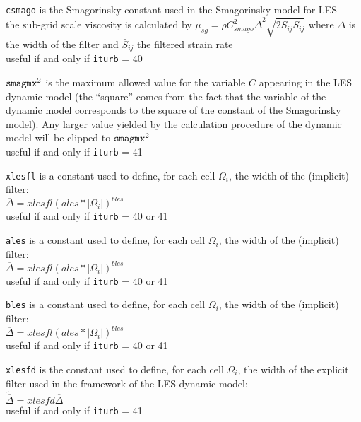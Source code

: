 {{\tt csmago} is the Smagorinsky constant used in
the Smagorinsky model for LES\\
the sub-grid scale viscosity is calculated by
 $\displaystyle\mu_{sg}=\rho C_{smago}^2\bar{\Delta}^2\sqrt{2\bar{S}_{ij}\bar{S}_{ij}}$
where $\bar{\Delta}$ is the width of the filter and $\bar{S}_{ij}$ the filtered
strain rate\\
useful if and only if {\tt iturb} = 40}

{${\tt smagmx}^2$ is
the maximum allowed value for the variable $C$ appearing in the LES dynamic
model (the ``square'' comes from the fact that the
variable of the dynamic model corresponds to the square of the
constant of the Smagorinsky model). Any larger value yielded by the calculation
procedure of the dynamic model will be clipped to ${\tt smagmx}^2$\\
useful if and only if {\tt iturb} = 41}

{{\tt xlesfl} is a constant used to define, for
each cell $\Omega_i$, the width of the (implicit) filter:\\
$\overline{\Delta}=xlesfl(ales*|\Omega_i|)^{bles}$\\
useful if and only if {\tt iturb} = 40 or 41}

{{\tt ales} is a constant used to define, for
each cell $\Omega_i$, the width of the (implicit) filter:\\
$\overline{\Delta}=xlesfl(ales*|\Omega_i|)^{bles}$\\
useful if and only if {\tt iturb} = 40 or 41}

{{\tt bles} is a constant used to define, for
each cell $\Omega_i$, the width of the (implicit) filter:\\
$\overline{\Delta}=xlesfl(ales*|\Omega_i|)^{bles}$\\
useful if and only if {\tt iturb} = 40 or 41}

{{\tt xlesfd} is the constant used to define, for
each cell $\Omega_i$, the width of the explicit filter used in the framework of
the LES dynamic model:\\
$\widetilde{\overline{\Delta}}=xlesfd\overline{\Delta}$\\
useful if and only if {\tt iturb} = 41}



